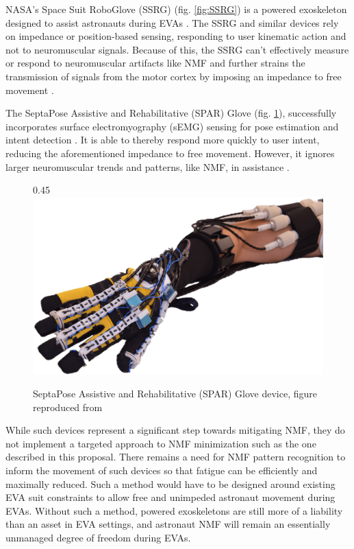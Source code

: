 \documentclass{article}
\begin{document}
NASA's Space Suit RoboGlove (SSRG) (fig. \ref{fig:SSRG}) is a powered exoskeleton designed to assist astronauts during EVAs \cite{Rogers2017DevelopmentAT,Madden2017TheIO, NASAHumanResearcherEvidenceBook}. The SSRG and similar devices rely on impedance or position-based sensing, responding to user kinematic action and not to neuromuscular signals. Because of this, the SSRG can't effectively measure or respond to neuromuscular artifacts like NMF and further strains the transmission of signals from the motor cortex by imposing an impedance to free movement \cite{Celik2010NormalizedMQ,Madden2017TheIO}. 

The SeptaPose Assistive and Rehabilitative (SPAR) Glove (fig. \ref{sparGlove}), successfully incorporates surface electromyography (sEMG) sensing for pose estimation and intent detection \cite{Rose2019HybridRH}. It is able to thereby respond more quickly to user intent, reducing the aforementioned impedance to free movement. However, it ignores larger neuromuscular trends and patterns, like NMF, in assistance \cite{Rose2019HybridRH}. 

\begin{figure}{0.45\textwidth}
    \centering
        \includegraphics[width=0.42\columnwidth]{figures/SPAR_Glove_System_3-min.png}
        \caption{SeptaPose Assistive and Rehabilitative (SPAR) Glove device, figure reproduced from \cite{Rose2019HybridRH}}
        \label{sparGlove}
\end{figure}

While such devices represent a significant step towards mitigating NMF, they do not implement a targeted approach to NMF minimization such as the one described in this proposal. There remains a need for NMF pattern recognition to inform the movement of such devices so that fatigue can be efficiently and maximally reduced. Such a method would have to be designed around existing EVA suit constraints to allow free and unimpeded astronaut movement during EVAs. Without such a method, powered exoskeletons are still more of a liability than an asset in EVA settings, and astronaut NMF will remain an essentially unmanaged degree of freedom during EVAs.
\end{document}
